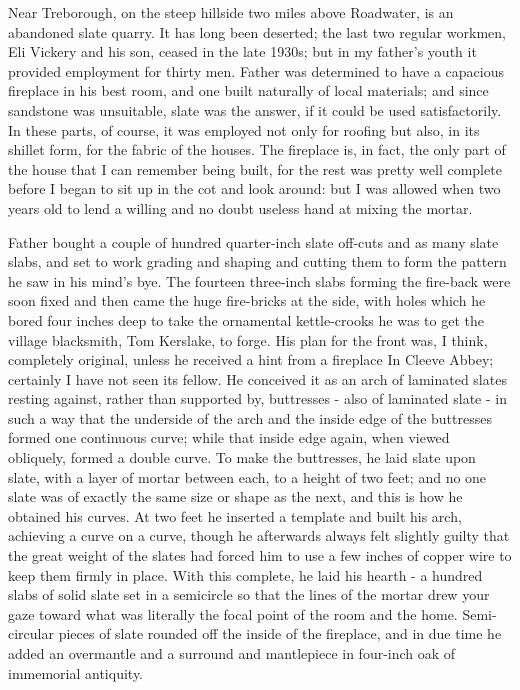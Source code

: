 Near Treborough, on the steep hillside two miles above Roadwater, is an abandoned slate quarry. It has long been deserted; the last two regular workmen, Eli Vickery and his son, ceased in the late 1930s; but in my father's youth it provided employment for thirty men. Father was determined to have a capacious fireplace in his best room, and one built naturally of local materials; and since sandstone was unsuitable, slate was the answer, if it could be used satisfactorily. In these parts, of course, it was employed not only for roofing but also, in its shillet form, for the fabric of the houses. The fireplace is, in fact, the only part of the house that I can remember being built, for the rest was pretty well complete before I began to sit up in the cot and look around: but I was allowed when two years old to lend a willing and no doubt useless hand at mixing the mortar.
 

Father bought a couple of hundred quarter-inch slate off-cuts and as many slate slabs, and set to work grading and shaping and cutting them to form the pattern he saw in his mind's bye. The fourteen three-inch slabs forming the fire-back were soon fixed and then came the huge fire-bricks at the side, with holes which he bored four inches deep to take the ornamental kettle-crooks he was to get the village blacksmith, Tom Kerslake, to forge. His plan for the front was, I think, completely original, unless he received a hint from a fireplace In Cleeve Abbey; certainly I have not seen its fellow. He conceived it as an arch of laminated slates resting against, rather than supported by, buttresses - also of laminated slate - in such a way that the underside of the arch and the inside edge of the buttresses formed one continuous curve; while that inside edge again, when viewed obliquely, formed a double curve. To make the buttresses, he laid slate upon slate, with a layer of mortar between each, to a height of two feet; and no one slate was of exactly the same size or shape as the next, and this is how he obtained his curves. At two feet he inserted a template and built his arch, achieving a curve on a curve, though he afterwards always felt slightly guilty that the great weight of the slates had forced him to use a few inches of copper wire to keep them firmly in place. With this complete, he laid his hearth - a hundred slabs of solid slate set in a semicircle so that the lines of the mortar drew your gaze toward what was literally the focal point of the room and the home. Semi-circular pieces of slate rounded off the inside of the fireplace, and in due time he added an overmantle and a surround and mantlepiece in four-inch oak of immemorial antiquity.

